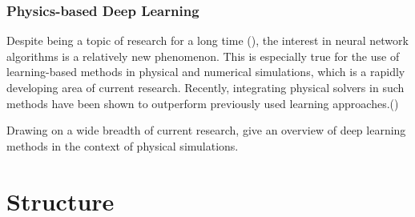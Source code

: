 \subsubsection*{Physics-based Deep Learning}
Despite being a topic of research for a long time (\cite{backprop}), the
interest in neural network algorithms is a relatively new phenomenon. This is
especially true for the use of learning-based methods in physical and numerical
simulations, which is a rapidly developing area of current research. Recently,
integrating physical solvers in such methods have been shown to outperform
previously used learning approaches.(\cite{solver-in-the-loop})

Drawing on a wide breadth of current research, \cite{pbdl} give an overview of
deep learning methods in the context of physical simulations. 


\section{Structure}


